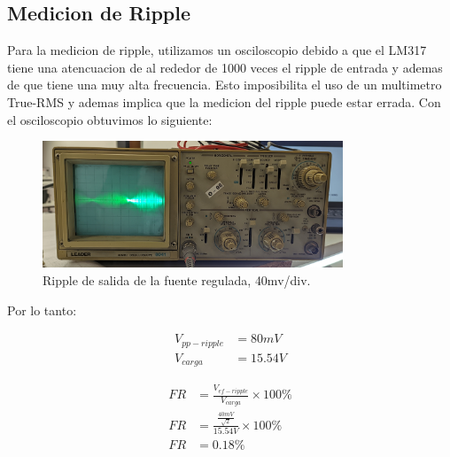 \documentclass[chaptersright]{informeutn}
\begin{document}
      \subsection{Medicion de Ripple}
        Para la medicion de ripple, utilizamos un osciloscopio debido a que el LM317 tiene una atencuacion de al
        rededor de 1000 veces el ripple de entrada y ademas de que tiene una muy alta frecuencia. Esto imposibilita el
        uso de un multimetro True-RMS y ademas implica que la medicion del ripple puede estar errada. Con el
        osciloscopio obtuvimos lo siguiente:
        \begin{figure}[H]
          \centering
          \includegraphics[width=0.8\textwidth]{pictures/reg_osc-ripp.jpg}
          \caption{Ripple de salida de la fuente regulada, 40mv/div.}
        \end{figure}

        Por lo tanto:
        \begin{figure}[!h]
          \centering
          \begin{minipage}{0.4\textwidth}
            \begin{align*}
              V_{pp-ripple} &= 80mV\\[6pt]
              V_{carga} &= 15.54V
            \end{align*}
          \end{minipage}
          \begin{minipage}{0.4\textwidth}
            \begin{align*}
              FR &= \frac{V_{ef-ripple}}{V_{carga}} \times 100\%\\[6pt]
              FR &= \frac{\frac{40mV}{\sqrt{2}}}{15.54V} \times 100\%\\[6pt]
              FR &= 0.18\%
            \end{align*}
          \end{minipage}
        \end{figure}
\end{document}
